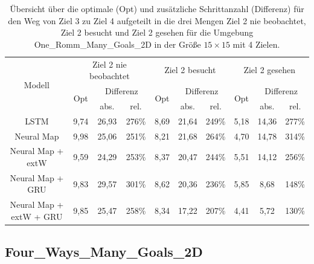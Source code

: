 \begin{table}
  \begin{tabular}{|c|c|c|c|c|c|c|c|c|c|}
    \hline
    \multirow{3}{*}{Modell} & \multicolumn{3}{|c|}{Ziel 2 nie beobachtet} & \multicolumn{3}{|c|}{Ziel 2 besucht} & \multicolumn{3}{|c|}{Ziel 2 gesehen} \\ \cline{2-10}
    & \multirow{2}{*}{Opt} & \multicolumn{2}{|c|}{Differenz} & \multirow{2}{*}{Opt} & \multicolumn{2}{|c|}{Differenz} & \multirow{2}{*}{Opt} & \multicolumn{2}{|c|}{Differenz} \\ \cline{3-4} \cline{6-7} \cline{9-10}
    & & abs. & rel. & & abs. & rel. & & abs. & rel. \\ \hline
    LSTM & 9,74 & 26,93 & 276\% & 8,69 & 21,64 & 249\% & 5,18 & 14,36 & 277\% \\ \hline
    Neural Map & 9,98 & 25,06 & 251\% & 8,21 & 21,68 & 264\% & 4,70 & 14,78 & 314\% \\ \hline
    Neural Map + extW & 9,59 & 24,29 & 253\% & 8,37 & 20,47 & 244\% & 5,51 & 14,12 & 256\% \\ \hline
    Neural Map + GRU & 9,83 & 29,57 & 301\% & 8,62 & 20,36 & 236\% & 5,85 & 8,68 & 148\% \\ \hline
    Neural Map + extW + GRU & 9,85 & 25,47 & 258\% & 8,34 & 17,22 & 207\% & 4,41 & 5,72 & 130\% \\ \hline
  \end{tabular}
  \caption{Übersicht über die optimale (Opt) und zusätzliche Schrittanzahl (Differenz) für den Weg von Ziel 3 zu Ziel 4 aufgeteilt in die drei Mengen \glqq Ziel 2 nie beobachtet\grqq{}, \glqq Ziel 2 besucht\grqq{} und \glqq Ziel 2 gesehen\grqq{} für die Umgebung \glqq One\_Romm\_Many\_Goals\_2D\grqq{} in der Größe $15 \times 15$ mit 4 Zielen.}
  \label{results15x15_3_to_4_per_M}
\end{table}

\subsection{Four\_Ways\_Many\_Goals\_2D}


